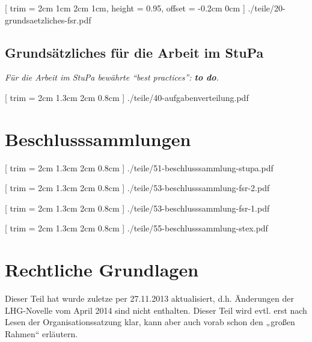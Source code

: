 \documentclass[
	10pt,
	a5paper,
	twoside
	]
	{book}
\begin{document}

	[
		trim = 2cm 1cm 2cm 1cm,
		height = 0.95\paperheight,
		offset = -0.2cm 0cm
	]
	{./teile/20-grundsaetzliches-fsr.pdf}


\section*{Grundsätzliches für die Arbeit im StuPa}

\textit{Für die Arbeit im StuPa bewährte “best practices”: \textbf{to do}.}

\clearpage




	[
		trim = 2cm 1.3cm 2cm 0.8cm
	]
	{./teile/40-aufgabenverteilung.pdf}


\chapter{Beschlusssammlungen}


\clearpage


%
%


	[
		trim = 2cm 1.3cm 2cm 0.8cm
	]
	{./teile/51-beschlusssammlung-stupa.pdf}


[
trim = 2cm 1.3cm 2cm 0.8cm
]
{./teile/53-beschlusssammlung-fsr-2.pdf}


[
trim = 2cm 1.3cm 2cm 0.8cm
]
{./teile/53-beschlusssammlung-fsr-1.pdf}


	[
		trim = 2cm 1.3cm 2cm 0.8cm
	]
	{./teile/55-beschlusssammlung-stex.pdf}


\chapter{Rechtliche Grundlagen}

Dieser Teil hat wurde zuletze per 27.11.2013 aktualisiert, d.h. Änderungen der LHG-Novelle vom April 2014 sind nicht enthalten. Dieser Teil wird evtl. erst nach Lesen der Organisationssatzung klar, kann aber auch vorab schon den „großen Rahmen“ erläutern.
\end{document}
